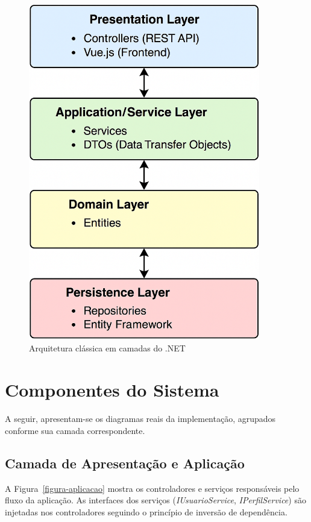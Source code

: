 \begin{figure}[H]
    \centering
    \includegraphics[width=0.9\textwidth]{figuras/arquitetura-dotnet-camadas.png}
    \caption{Arquitetura clássica em camadas do .NET}
    \label{figura-arquitetura-classica-dotnet}
\end{figure}

\section{Componentes do Sistema}

A seguir, apresentam-se os diagramas reais da implementação, agrupados conforme sua camada correspondente.

\subsection{Camada de Apresentação e Aplicação}

A Figura~\ref{figura-aplicacao} mostra os controladores e serviços responsáveis pelo fluxo da aplicação. As interfaces dos serviços (\textit{IUsuarioService}, \textit{IPerfilService}) são injetadas nos controladores seguindo o princípio de inversão de dependência.

